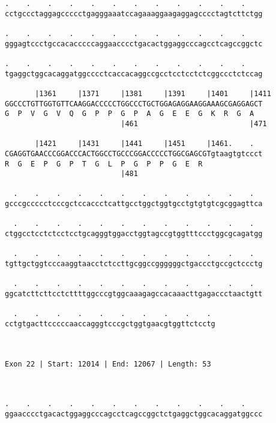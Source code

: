 \documentclass{article}
\begin{document}
\begin{Verbatim}
.    .    .    .    .    .    .    .    .    .    .    .    
cctgccctaggagccccctgagggaaatccagaaaggaagaggagcccctagtcttctgg
                                                            
.    .    .    .    .    .    .    .    .    .    .    .    
gggagtccctgccacacccccaggaacccctgacactggaggcccagcctcagccggctc
                                                            
.    .    .    .    .    .    .    .    .    .    .    .    
tgaggctggcacaggatggcccctcaccacaggccgcctcctcctctcggccctctccag
                                                            
       |1361     |1371     |1381     |1391     |1401     |1411
GGCCCTGTTGGTGTTCAAGGACCCCCTGGCCCTGCTGGAGAGGAAGGAAAGCGAGGAGCT
G  P  V  G  V  Q  G  P  P  G  P  A  G  E  E  G  K  R  G  A  
                           |461                          |471
  
       |1421     |1431     |1441     |1451     |1461.    .  
CGAGGTGAACCCGGACCCACTGGCCTGCCCGGACCCCCTGGCGAGCGTgtaagtgtccct
R  G  E  P  G  P  T  G  L  P  G  P  P  G  E  R              
                           |481                             
  
  .    .    .    .    .    .    .    .    .    .    .    .  
gcccgccccctcccgctccaccctcattgcctggctggtgcctgtgtgtcgcggagttca
                                                            
  .    .    .    .    .    .    .    .    .    .    .    .  
ctggcctcctctcctcctgcagggtggacctggtagccgtggtttccctggcgcagatgg
                                                            
  .    .    .    .    .    .    .    .    .    .    .    .  
tgttgctggtcccaaggtaacctctccttgcggccggggggctgaccctgccgctccctg
                                                            
  .    .    .    .    .    .    .    .    .    .    .    .  
ggcatcttcttcctcttttggcccgtggcaaagagccacaaacttgagaccctaactgtt
                                                            
  .    .    .    .    .    .    .    .    .    . 
cctgtgacttcccccaaccagggtcccgctggtgaacgtggttctcctg
                                                 
                                                 
 
Exon 22 | Start: 12014 | End: 12067 | Length: 53



.    .    .    .    .    .    .    .    .    .    .    .    
ggaacccctgacactggaggcccagcctcagccggctctgaggctggcacaggatggccc
                                                            

\end{Verbatim}
\end{document}

